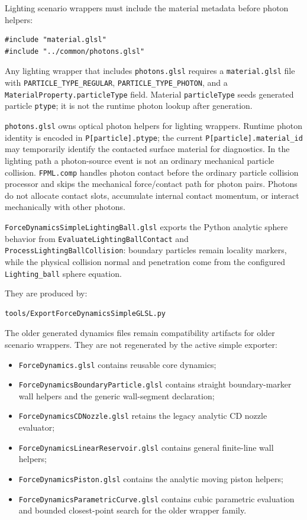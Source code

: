 Lighting scenario wrappers must include the material metadata before photon
helpers:
\begin{verbatim}
#include "material.glsl"
#include "../common/photons.glsl"
\end{verbatim}
Any lighting wrapper that includes \texttt{photons.glsl} requires a
\texttt{material.glsl} file with \texttt{PARTICLE\_TYPE\_REGULAR},
\texttt{PARTICLE\_TYPE\_PHOTON}, and a \texttt{MaterialProperty.particleType}
field.  Material \texttt{particleType} seeds generated particle
\texttt{ptype}; it is not the runtime photon lookup after generation.

\texttt{photons.glsl} owns optical photon helpers for lighting wrappers.
Runtime photon identity is encoded in \texttt{P[particle].ptype}; the current
\texttt{P[particle].material\_id} may temporarily identify the contacted
surface material for diagnostics.  In the lighting path a photon-source event
is not an ordinary mechanical particle collision.  \texttt{FPML.comp} handles
photon contact before the ordinary particle collision processor and skips the
mechanical force/contact path for photon pairs.  Photons do not allocate
contact slots, accumulate internal contact momentum, or interact mechanically
with other photons.

\texttt{ForceDynamicsSimpleLightingBall.glsl} exports the Python analytic
sphere behavior from \texttt{EvaluateLightingBallContact} and
\texttt{ProcessLightingBallCollision}: boundary particles remain locality
markers, while the physical collision normal and penetration come from the
configured \texttt{Lighting\_ball} sphere equation.

They are produced by:
\begin{verbatim}
tools/ExportForceDynamicsSimpleGLSL.py
\end{verbatim}

The older generated dynamics files remain compatibility artifacts for older
scenario wrappers.  They are not regenerated by the active simple exporter:
\begin{itemize}
    \item \texttt{ForceDynamics.glsl} contains reusable core dynamics;
    \item \texttt{ForceDynamicsBoundaryParticle.glsl} contains straight
    boundary-marker wall helpers and the generic wall-segment declaration;
    \item \texttt{ForceDynamicsCDNozzle.glsl} retains the legacy analytic CD
    nozzle evaluator;
    \item \texttt{ForceDynamicsLinearReservoir.glsl} contains general
    finite-line wall helpers;
    \item \texttt{ForceDynamicsPiston.glsl} contains the analytic moving
    piston helpers;
    \item \texttt{ForceDynamicsParametricCurve.glsl} contains cubic
    parametric evaluation and bounded closest-point search for the older
    wrapper family.
\end{itemize}

